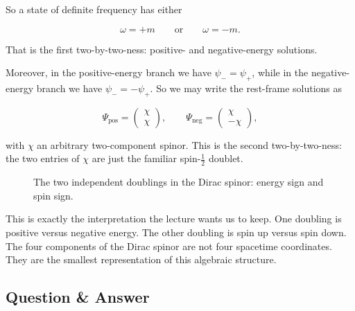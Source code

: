 So a state of definite frequency has either

\begin{equation}
\omega=+m
\qquad \text{or} \qquad
\omega=-m.
\end{equation}

That is the first two-by-two-ness: positive- and negative-energy solutions.

Moreover, in the positive-energy branch we have \(\psi_-=\psi_+\), while in the negative-energy branch we have \(\psi_-=-\psi_+\). So we may write the rest-frame solutions as

\begin{equation}
\Psi_{\mathrm{pos}}=
\begin{pmatrix}
\chi\\
\chi
\end{pmatrix},
\qquad
\Psi_{\mathrm{neg}}=
\begin{pmatrix}
\chi\\
-\chi
\end{pmatrix},
\end{equation}

with \(\chi\) an arbitrary two-component spinor. This is the second two-by-two-ness: the two entries of \(\chi\) are just the familiar spin-\(\tfrac12\) doublet.

\begin{figure}[t]
\centering
{}
\caption{The two independent doublings in the Dirac spinor: energy sign and spin sign.}
\end{figure}

This is exactly the interpretation the lecture wants us to keep. One doubling is positive versus negative energy. The other doubling is spin up versus spin down. The four components of the Dirac spinor are not four spacetime coordinates. They are the smallest representation of this algebraic structure.

\subsection{Question \& Answer}

